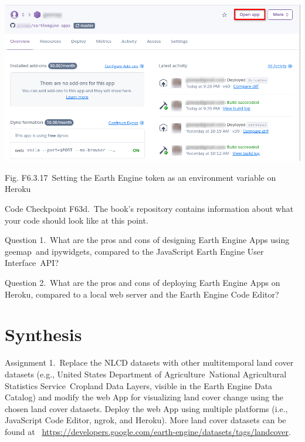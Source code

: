 \documentclass[
  letterpaper,
  DIV=11,
  numbers=noendperiod]{scrreprt}
\begin{document}
\includegraphics{./F6/image51.png}

Fig. F6.3.17~Setting the Earth Engine token as an environment variable
on Heroku

\begin{tcolorbox}[enhanced jigsaw, left=2mm, breakable, rightrule=.15mm, opacityback=0, colframe=quarto-callout-note-color-frame, colbacktitle=quarto-callout-note-color!10!white, arc=.35mm, opacitybacktitle=0.6, toptitle=1mm, colback=white, leftrule=.75mm, title=\textcolor{quarto-callout-note-color}{\faInfo}\hspace{0.5em}{Note}, toprule=.15mm, bottomtitle=1mm, titlerule=0mm, bottomrule=.15mm, coltitle=black]

Code Checkpoint F63d.~The book's repository contains information about
what your code should look like at this point.

\end{tcolorbox}

Question 1.~What are the pros and cons of designing Earth Engine Apps
using geemap~and ipywidgets, compared to the JavaScript Earth Engine
User Interface~API?

Question 2.~What are the pros and cons of deploying Earth Engine Apps on
Heroku, compared to a local web server and the Earth Engine Code Editor?

\hypertarget{synthesis-20}{%
\section*{Synthesis}\label{synthesis-20}}


Assignment 1.~Replace the NLCD datasets with other multitemporal land
cover datasets (e.g., United States Department of Agriculture~National
Agricultural Statistics Service~Cropland Data Layers, visible in the
Earth Engine Data Catalog) and modify the web App for visualizing land
cover change using the chosen land cover datasets. Deploy the web App
using multiple platforms (i.e., JavaScript Code Editor, ngrok, and
Heroku). More land cover datasets can be found at
~\href{https://www.google.com/url?q=https://developers.google.com/earth-engine/datasets/tags/landcover\&sa=D\&source=editors\&ust=1671458841352828\&usg=AOvVaw0rYGxg8JD8U1d92jnx8V1i}{https://developers.google.com/earth-engine/datasets/tags/landcover}.
\end{document}
